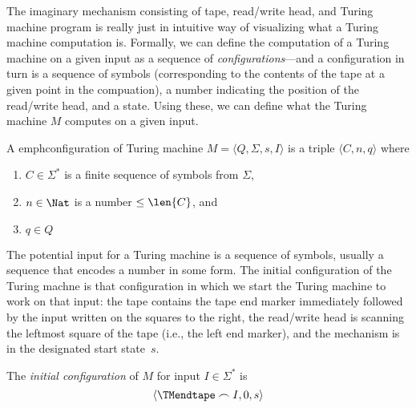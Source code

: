 \documentclass[../../include/open-logic-section]{subfiles}
\begin{document}

\begin{explain}
The imaginary mechanism consisting of tape, read/write head, and
Turing machine program is really just in intuitive way of visualizing
what a Turing machine computation is.  Formally, we can define the
computation of a Turing machine on a given input as a sequence of
\emph{configurations}---and a configuration in turn is a sequence of
symbols (corresponding to the contents of the tape at a given point in
the compuation), a number indicating the position of the read/write
head, and a state.  Using these, we can define what the Turing machine
$M$ computes on a given input.
\end{explain}

\begin{defn}
A emph{configuration} of Turing machine $M = \langle Q, \Sigma, s,
I\rangle$ is a triple $\langle C, n, q\rangle$ where
\begin{enumerate}
\item $C \in \Sigma^*$ is a finite sequence of symbols from $\Sigma$,
\item $n \in \Nat$ is a number $\le \len{C}$, and
\item $q \in Q$ 
\end{enumerate}
\end{defn}

\begin{explain}
The potential input for a Turing machine is a sequence of symbols,
usually a sequence that encodes a number in some form.  The initial
configuration of the Turing machne is that configuration in which we
start the Turing machine to work on that input: the tape contains the
tape end marker immediately followed by the input written on the
squares to the right, the read/write head is scanning the leftmost
square of the tape (i.e., the left end marker), and the mechanism is
in the designated start state~$s$.
\end{explain}

\begin{defn}
The \emph{initial configuration} of $M$ for input $I \in \Sigma^*$ is
\[
\langle \TMendtape \frown I, 0, s\rangle
\]
\end{defn}
\end{document}
